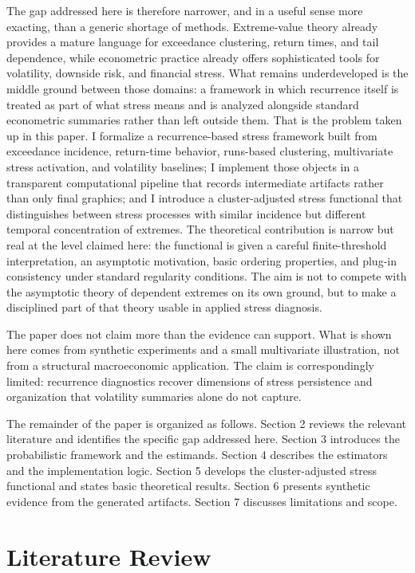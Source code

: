 \documentclass[11pt]{article}
\begin{document}
The gap addressed here is therefore narrower, and in a useful sense more exacting, than a generic shortage of methods. Extreme-value theory already provides a mature language for exceedance clustering, return times, and tail dependence, while econometric practice already offers sophisticated tools for volatility, downside risk, and financial stress. What remains underdeveloped is the middle ground between those domains: a framework in which recurrence itself is treated as part of what stress means and is analyzed alongside standard econometric summaries rather than left outside them. That is the problem taken up in this paper. I formalize a recurrence-based stress framework built from exceedance incidence, return-time behavior, runs-based clustering, multivariate stress activation, and volatility baselines; I implement those objects in a transparent computational pipeline that records intermediate artifacts rather than only final graphics; and I introduce a cluster-adjusted stress functional that distinguishes between stress processes with similar incidence but different temporal concentration of extremes. The theoretical contribution is narrow but real at the level claimed here: the functional is given a careful finite-threshold interpretation, an asymptotic motivation, basic ordering properties, and plug-in consistency under standard regularity conditions. The aim is not to compete with the asymptotic theory of dependent extremes on its own ground, but to make a disciplined part of that theory usable in applied stress diagnosis.

The paper does not claim more than the evidence can support. What is shown here comes from synthetic experiments and a small multivariate illustration, not from a structural macroeconomic application. The claim is correspondingly limited: recurrence diagnostics recover dimensions of stress persistence and organization that volatility summaries alone do not capture.

The remainder of the paper is organized as follows. Section 2 reviews the relevant literature and identifies the specific gap addressed here. Section 3 introduces the probabilistic framework and the estimands. Section 4 describes the estimators and the implementation logic. Section 5 develops the cluster-adjusted stress functional and states basic theoretical results. Section 6 presents synthetic evidence from the generated artifacts. Section 7 discusses limitations and scope.

\section{Literature Review}
\end{document}
